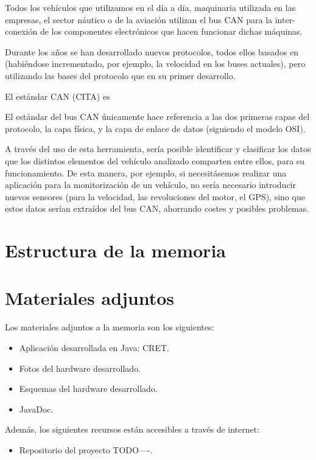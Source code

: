 
Todos los vehículos que utilizamos en el día a día, maquinaria utilizada en las empresas, el sector náutico o de la aviación utilizan el bus CAN para la inter-conexión de los componentes electrónicos que hacen funcionar dichas máquinas.

Durante los años se han desarrollado nuevos protocolos, todos ellos basados en  (habiéndose incrementado, por ejemplo, la velocidad en los buses actuales), pero utilizando las bases del protocolo que en su primer desarrollo.

El estándar CAN (CITA) es 

El estándar del bus CAN únicamente hace referencia a las dos primeras capas del protocolo, la capa física, y la capa de enlace de datos (siguiendo el modelo OSI).


A través del uso de esta herramienta, sería posible identificar y clasificar los datos que los distintos elementos del vehículo analizado comparten entre ellos, para su funcionamiento. De esta manera, por ejemplo, si necesitásemos realizar una aplicación para la monitorización de un vehículo, no sería necesario introducir nuevos sensores (para la velocidad, las revoluciones del motor, el GPS), sino que estos datos serían extraídos del bus CAN, ahorrando costes y posibles problemas.

\section{Estructura de la memoria}\label{estructura-de-la-memoria}



\section{Materiales adjuntos}\label{materiales-adjuntos}

Los materiales adjuntos a la memoria son los siguientes:

\begin{itemize}
\tightlist
\item
	Aplicación desarrollada en Java: CRET.
\item	
	Fotos del hardware desarrollado.
\item
	Esquemas del hardware desarrollado.
\item	
	JavaDoc.
\end{itemize}

Además, los siguientes recursos están accesibles a través de internet:

\begin{itemize}
\tightlist
\item
  Repositorio del proyecto TODO----.
\end{itemize}
